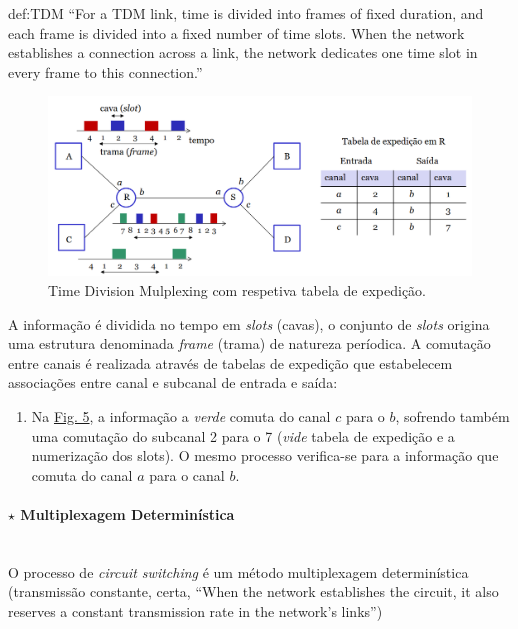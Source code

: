 \begin{theo}{def:TDM}\label{def:TDM}
    ``For a TDM link, time is divided into frames of fixed duration, and each frame is divided into a fixed number of time slots. When the network establishes a connection across a link, the network dedicates one time slot in every frame to this connection.''\cite{Kurose2017}
\end{theo}

\begin{figure}[H]
    \centering
    \includegraphics[width = 1\linewidth]{img/1/TDM.png}
    \caption{Time Division Mulplexing com respetiva tabela de expedição.}
    \label{fig:TDM}
\end{figure}

\noindent A informação é dividida no tempo em \textit{slots} (cavas), o conjunto de \textit{slots} origina uma estrutura denominada \textit{frame} (trama) de natureza períodica. A comutação entre canais é realizada através de tabelas de expedição que estabelecem associações entre canal e subcanal de entrada e saída:
\begin{enumerate}[label=$\rightarrow$]
    \item Na \hyperref[fig:TDM]{Fig. 5}, a informação a \textit{verde} comuta do canal $c$ para o $b$, sofrendo também uma comutação do subcanal 2 para o 7 (\textit{vide} tabela de expedição e a numerização dos slots). O mesmo processo verifica-se para a informação que comuta do canal $a$ para o canal $b$.
\end{enumerate}


\paragraph[1.2.1.3 Multiplexagem Determinística]{$\pmb{\star}$ Multiplexagem Determinística}\mbox{}\\[4pt]
O processo de \textit{circuit switching} é um método multiplexagem determinística (transmissão constante, certa, ``When the network establishes the circuit, it also reserves a constant transmission rate in the network’s links''\cite{Kurose2017})

